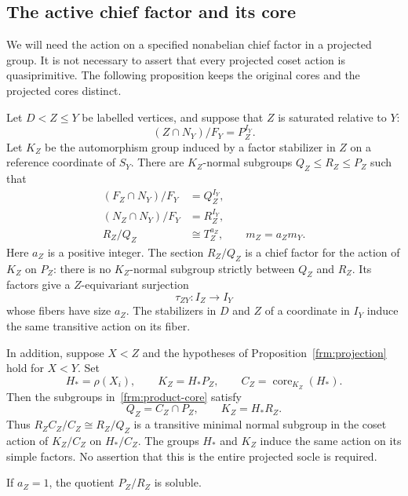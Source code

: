 \subsection{The active chief factor and its core}

We will need the action on a specified nonabelian chief factor in a
projected group. It is not necessary to assert that every projected
coset action is quasiprimitive. The following proposition keeps the
original cores and the projected cores distinct.

\begin{proposition}
\label{frm:active-transport}
Let $D<Z\le Y$ be labelled vertices, and suppose that $Z$ is saturated
relative to $Y$:
\[
 (Z\cap N_Y)/F_Y=P_Z^{I_Y}.
\]
Let $K_Z$ be the automorphism group induced by a factor stabilizer in
$Z$ on a reference coordinate of $S_Y$. There are $K_Z$-normal
subgroups $Q_Z\le R_Z\le P_Z$ such that
\begin{align}
 \label{frm:product-core}
 (F_Z\cap N_Y)/F_Y&=Q_Z^{I_Y},\\
 \label{frm:product-active-preimage}
 (N_Z\cap N_Y)/F_Y&=R_Z^{I_Y},\\
 \label{frm:coordinate-chief}
 R_Z/Q_Z&\cong T_Z^{a_Z},\qquad m_Z=a_Zm_Y.
\end{align}
Here $a_Z$ is a positive integer. The section $R_Z/Q_Z$ is a chief factor for the action of $K_Z$ on
$P_Z$: there is no $K_Z$-normal subgroup strictly between $Q_Z$ and
$R_Z$. Its factors give a $Z$-equivariant surjection
\begin{equation}
 \label{frm:product-support}
 \tau_{ZY}:I_Z\longrightarrow I_Y
\end{equation}
whose fibers have size $a_Z$. The stabilizers in $D$ and $Z$ of a
coordinate in $I_Y$ induce the same transitive action on its fiber.

In addition, suppose $X<Z$ and the hypotheses of
Proposition~\ref{frm:projection} hold for $X<Y$. Set
\[
 H_* = \rho(X_i),\qquad K_Z=H_*P_Z,
 \qquad C_Z=\operatorname{core}_{K_Z}(H_*).
\]
Then the subgroups in~\eqref{frm:product-core} satisfy
\begin{equation}
 \label{frm:projected-core}
 Q_Z=C_Z\cap P_Z,
 \qquad K_Z=H_*R_Z.
\end{equation}
Thus $R_ZC_Z/C_Z\cong R_Z/Q_Z$ is a transitive minimal normal
subgroup in the coset action of $K_Z/C_Z$ on $H_*/C_Z$.
The groups $H_*$ and $K_Z$ induce the same action on its simple factors.
No assertion that this is the entire projected socle is required.

If $a_Z=1$, the quotient $P_Z/R_Z$ is soluble.
\end{proposition}

